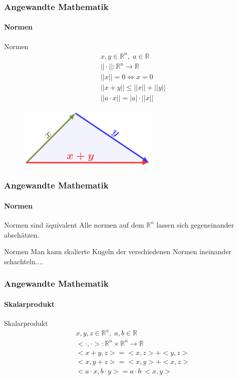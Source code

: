 \documentclass{beamer}
\begin{document}
\begin{frame}
    \frametitle{Angewandte Mathematik}
\framesubtitle{Normen}

    \begin{block}{Normen}
\begin{align*}
  & x,y \in \mathbb{R}^n, \; a \in \mathbb{R} \\
& || \cdot || : \mathbb{R}^n \to \mathbb{R} \\
 & ||x|| = 0 \Leftrightarrow  x = 0 \\
& ||x+y|| \leq ||x|| + ||y|| \\
& ||a \cdot x|| = |a| \cdot ||x||
\end{align*}
\end{block}
\begin{figure}[H]
      \centering
    \includegraphics[width=0.6\textwidth]{images/triangle-inequality}
\end{figure}

 \end{frame}


\begin{frame}
    \frametitle{Angewandte Mathematik}
\framesubtitle{Normen}

    \begin{block}{Normen sind äquivalent}
Alle normen auf dem $\mathbb{R}^n$ lassen sich gegeneinander abschätzen.

\end{block}
    \begin{block}{Normen}
Man kann skalierte Kugeln der verschiedenen Normen ineinander schachteln....
\end{block}


 \end{frame}



\begin{frame}
    \frametitle{Angewandte Mathematik}
\framesubtitle{Skalarprodukt}
 \begin{block}{Skalarprodukt}
\begin{align*}
  & x,y,z \in \mathbb{R}^n, \; a,b \in \mathbb{R} \\
& < \cdot, \cdot > : \mathbb{R}^n \times \mathbb{R}^n  \to \mathbb{R} \\
& <x+y, z> = <x,z> + <y,z> \\
& <x, y+z> = <x,y> + <x,z> \\
& <a\cdot x, b \cdot y> = a \cdot b \cdot <x,y>  
\end{align*}
\end{block}
 \end{frame}
\end{document}
